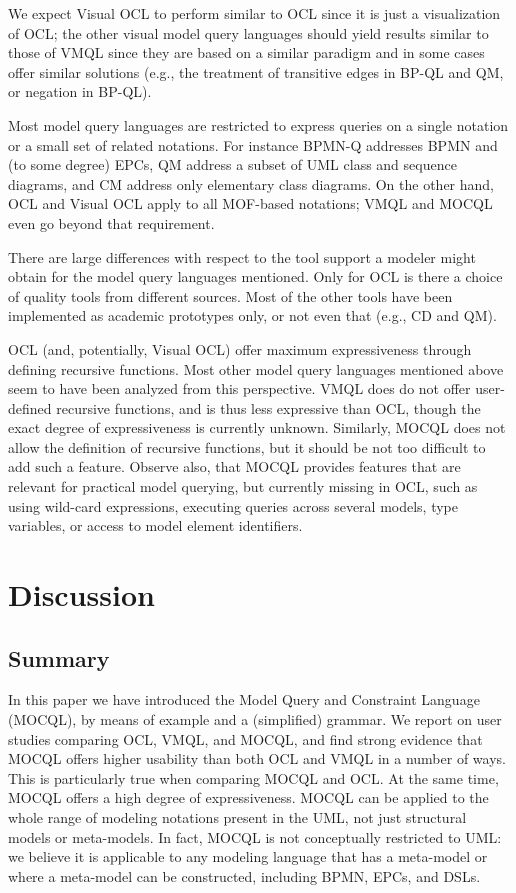 \documentclass{llncs}
\newcommand{\MMQ}{MOCQL\xspace}
\begin{document}
We expect Visual OCL to perform similar to OCL since it is just a visualization of OCL; the other visual model query languages should yield results similar to those of VMQL since they are based on a similar paradigm and in some cases offer similar solutions (e.g., the treatment of transitive edges in BP-QL and QM, or negation in BP-QL).

Most model query languages are restricted to express queries on a single notation or a small set of related notations. For instance BPMN-Q addresses BPMN and (to some degree) EPCs, QM address a subset of UML class and sequence diagrams, and CM address only elementary class diagrams. On the other hand, OCL and Visual OCL apply to all MOF-based notations; VMQL and \MMQ even go beyond that requirement.

There are large differences with respect to the tool support a modeler might obtain for the model query languages mentioned. Only for OCL is there a choice of quality tools from different sources. Most of the other tools have been implemented as academic prototypes only, or not even that (e.g., CD and QM).

OCL (and, potentially, Visual OCL) offer maximum expressiveness through defining recursive functions. Most other model query languages mentioned above seem to have been analyzed from this perspective. VMQL does do not offer user-defined recursive functions, and is thus less expressive than OCL, though the exact degree of expressiveness is currently unknown. Similarly, \MMQ does not allow the definition of recursive functions, but it should be not too difficult to add such a feature. Observe also, that \MMQ provides features that are relevant for practical model querying, but currently missing in OCL, such as using wild-card expressions, executing queries across several models, type variables, or access to model element identifiers.


\section{Discussion}

\subsection{Summary}

In this paper we have introduced the Model Query and Constraint Language (\MMQ), by means of example and a (simplified) grammar. We report on user studies comparing OCL, VMQL, and \MMQ, and find strong evidence that \MMQ offers higher usability than both OCL and VMQL in a number of ways. This is particularly true when comparing \MMQ and OCL. At the same time, \MMQ offers a high degree of expressiveness. \MMQ can be applied to the whole range of modeling notations present in the UML, not just structural models or meta-models. In fact, \MMQ is not conceptually restricted to UML: we believe it is applicable to any modeling language that has a meta-model or where a meta-model can be constructed, including BPMN, EPCs, and DSLs.
\end{document}
